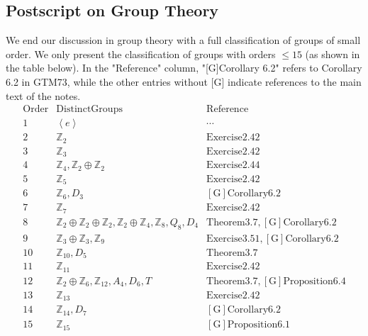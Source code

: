 \subsection{Postscript on Group Theory}
We end our discussion in group theory with a full classification of groups of small order. We only present the classification of groups with orders $\leq 15$ (as shown in the table below). In the "Reference" column, "[G]Corollary 6.2" refers to Corollary 6.2 in GTM73, while the other entries without [G] indicate references to the main text of the notes.
$$
\begin{matrix}
	\mathrm{Order}&		\mathrm{Distinct} \mathrm{Groups}&		\mathrm{Reference}\\
	1&		\left< e \right>&		\cdots\\
	2&		\mathbb{Z} _2&		\mathrm{Exercise}2.42\\
	3&		\mathbb{Z} _3&		\mathrm{Exercise}2.42\\
	4&		\mathbb{Z} _4,\mathbb{Z} _2\oplus \mathbb{Z} _2&		\mathrm{Exercise}2.44\\
	5&		\mathbb{Z} _5&		\mathrm{Exercise}2.42\\
	6&		\mathbb{Z} _6,D_3&		\left[ \mathrm{G} \right] \mathrm{Corollary}6.2\\
	7&		\mathbb{Z} _7&		\mathrm{Exercise}2.42\\
	8&		\mathbb{Z} _2\oplus \mathbb{Z} _2\oplus \mathbb{Z} _2,\mathbb{Z} _2\oplus \mathbb{Z} _4,\mathbb{Z} _8,Q_8,D_4&		\mathrm{Theorem}3.7,\left[ \mathrm{G} \right] \mathrm{Corollary}6.2\\
	9&		\mathbb{Z} _3\oplus \mathbb{Z} _3,\mathbb{Z} _9&		\mathrm{Exercise}3.51,\left[ \mathrm{G} \right] \mathrm{Corollary}6.2\\
	10&		\mathbb{Z} _{10},D_5&		\mathrm{Theorem}3.7\\
	11&		\mathbb{Z} _{11}&		\mathrm{Exercise}2.42\\
	12&		\mathbb{Z} _2\oplus \mathbb{Z} _6,\mathbb{Z} _{12},A_4,D_6,T&		\mathrm{Theorem}3.7,\left[ \mathrm{G} \right] \mathrm{Proposition}6.4\\
	13&		\mathbb{Z} _{13}&		\mathrm{Exercise}2.42\\
	14&		\mathbb{Z} _{14},D_7&		\left[ \mathrm{G} \right] \mathrm{Corollary}6.2\\
	15&		\mathbb{Z} _{15}&		\left[ \mathrm{G} \right] \mathrm{Proposition}6.1\\
\end{matrix}
$$